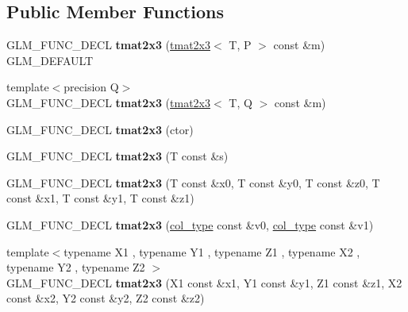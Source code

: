 \subsection*{Public Member Functions}
\begin{DoxyCompactItemize}
\item 
\hypertarget{structglm_1_1tmat2x3_a8552e4158f1d2e3fa2aac635585e7f94}{G\-L\-M\-\_\-\-F\-U\-N\-C\-\_\-\-D\-E\-C\-L {\bfseries tmat2x3} (\hyperlink{structglm_1_1tmat2x3}{tmat2x3}$<$ T, P $>$ const \&m) G\-L\-M\-\_\-\-D\-E\-F\-A\-U\-L\-T}\label{structglm_1_1tmat2x3_a8552e4158f1d2e3fa2aac635585e7f94}

\item 
\hypertarget{structglm_1_1tmat2x3_ae12411a80e806874d766c81fcb5b55b3}{{\footnotesize template$<$precision Q$>$ }\\G\-L\-M\-\_\-\-F\-U\-N\-C\-\_\-\-D\-E\-C\-L {\bfseries tmat2x3} (\hyperlink{structglm_1_1tmat2x3}{tmat2x3}$<$ T, Q $>$ const \&m)}\label{structglm_1_1tmat2x3_ae12411a80e806874d766c81fcb5b55b3}

\item 
\hypertarget{structglm_1_1tmat2x3_a3244a25a872509a0145e074675dabdee}{G\-L\-M\-\_\-\-F\-U\-N\-C\-\_\-\-D\-E\-C\-L {\bfseries tmat2x3} (ctor)}\label{structglm_1_1tmat2x3_a3244a25a872509a0145e074675dabdee}

\item 
\hypertarget{structglm_1_1tmat2x3_a9b89f85e06358301eb52f1a1cffb7875}{G\-L\-M\-\_\-\-F\-U\-N\-C\-\_\-\-D\-E\-C\-L {\bfseries tmat2x3} (T const \&s)}\label{structglm_1_1tmat2x3_a9b89f85e06358301eb52f1a1cffb7875}

\item 
\hypertarget{structglm_1_1tmat2x3_ace71789e816ec441b178dd26e3f6ad2d}{G\-L\-M\-\_\-\-F\-U\-N\-C\-\_\-\-D\-E\-C\-L {\bfseries tmat2x3} (T const \&x0, T const \&y0, T const \&z0, T const \&x1, T const \&y1, T const \&z1)}\label{structglm_1_1tmat2x3_ace71789e816ec441b178dd26e3f6ad2d}

\item 
\hypertarget{structglm_1_1tmat2x3_a4321710182d684f5fd821657c2c950ec}{G\-L\-M\-\_\-\-F\-U\-N\-C\-\_\-\-D\-E\-C\-L {\bfseries tmat2x3} (\hyperlink{structglm_1_1tvec3}{col\-\_\-type} const \&v0, \hyperlink{structglm_1_1tvec3}{col\-\_\-type} const \&v1)}\label{structglm_1_1tmat2x3_a4321710182d684f5fd821657c2c950ec}

\item 
\hypertarget{structglm_1_1tmat2x3_af0c4d0bfd54a85de217e347720c922c0}{{\footnotesize template$<$typename X1 , typename Y1 , typename Z1 , typename X2 , typename Y2 , typename Z2 $>$ }\\G\-L\-M\-\_\-\-F\-U\-N\-C\-\_\-\-D\-E\-C\-L {\bfseries tmat2x3} (X1 const \&x1, Y1 const \&y1, Z1 const \&z1, X2 const \&x2, Y2 const \&y2, Z2 const \&z2)}\label{structglm_1_1tmat2x3_af0c4d0bfd54a85de217e347720c922c0}


\end{DoxyCompactItemize}
